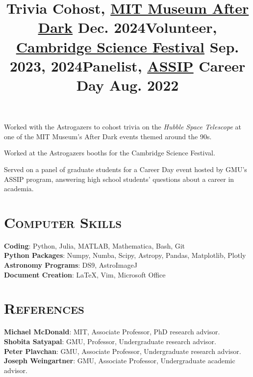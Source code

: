 \documentclass[marg, centered]{res}
\begin{document}
\begin{resume}
\title{\textbf{Trivia Cohost}, \href{https://mitmuseum.mit.edu/programs/mit-museum-after-dark}{\color{dkbu} MIT Museum After Dark} \hfill \textbf{Dec. 2024}}
\begin{position}
{\small Worked with the Astrogazers to cohost trivia on the \textit{Hubble Space Telescope} at one of the MIT Museum's After Dark events themed around the 90s.}
\end{position}

\title{\textbf{Volunteer}, \href{https://cambridgesciencefestival.org/}{\color{dkbu} Cambridge Science Festival} \hfill \textbf{Sep. 2023, 2024}}
\begin{position}
{\small Worked at the Astrogazers booths for the Cambridge Science Festival.}
\end{position}

\title{\textbf{Panelist}, \href{https://science.gmu.edu/assip}{\color{dkbu} ASSIP} Career Day \hfill \textbf{Aug. 2022}}
\begin{position}
{\small Served on a panel of graduate students for a Career Day event hosted by GMU's ASSIP program, answering high school students' questions about a career in academia.}
\end{position}


\section{\scshape \bfseries Computer Skills}

\textbf{Coding}{: Python, Julia, MATLAB, Mathematica, Bash, Git} \\ 
\textbf{Python Packages}{: Numpy, Numba, Scipy, Astropy, Pandas, Matplotlib, Plotly} \\
\textbf{Astronomy Programs}{: DS9, AstroImageJ} \\
\textbf{Document Creation}{: \LaTeX, Vim, Microsoft Office} \\


\section{{\scshape \bfseries References}}
\textbf{Michael McDonald}{: MIT, Associate Professor, PhD research advisor.}\\
\textbf{Shobita Satyapal}{: GMU, Professor, Undergraduate research advisor.}\\
\textbf{Peter Plavchan}{: GMU, Associate Professor, Undergraduate research advisor.}\\
\textbf{Joseph Weingartner}{: GMU,  Associate Professor, Undergraduate academic advisor.}\\

\end{resume}
\end{document}
